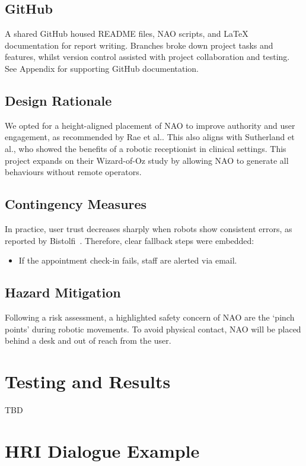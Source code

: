 \documentclass[conference]{IEEEtran}
\begin{document}
\subsection{GitHub} A shared GitHub housed README files, NAO scripts, and LaTeX documentation for report writing. Branches broke down project tasks and features, whilst version control assisted with project collaboration and testing. See Appendix for supporting GitHub documentation.

\subsection{Design Rationale} We opted for a height-aligned placement of NAO to improve authority and user engagement,
as recommended by Rae et al.\cite{Rae2013}. This also aligns with Sutherland et al.\cite{Sutherland2019}, who showed the benefits of
a robotic receptionist in clinical settings. This project expands on their Wizard-of-Oz study by allowing NAO to generate all behaviours without remote operators.

\subsection{Contingency Measures} In practice, user trust decreases sharply when robots show consistent errors, as reported by Bistolfi~\cite{Bistolfi2022}.
Therefore, clear fallback steps were embedded:
\begin{itemize}
        \item If the appointment check-in fails, staff are alerted via email.
\end{itemize}

\subsection{Hazard Mitigation} Following a risk assessment, a highlighted safety concern of NAO are the ‘pinch points’ during robotic movements. To avoid physical contact, NAO will be placed behind a desk and out of reach from the user.

\section{Testing and Results}

TBD

\section{HRI Dialogue Example}
\end{document}
